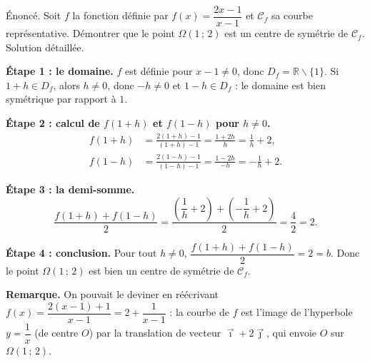 \documentclass[11pt]{article}
\def\setminus{\mathbin{\backslash}}\let\smallsetminus\setminus
\begin{document}
\begin{exoresolu}[Montrer que $\Omega(1\,;\,2)$ est centre de symétrie de la courbe de $f(x) = \dfrac{2x-1}{x-1}$]
Énoncé. Soit $f$ la fonction définie par $f(x) = \dfrac{2x - 1}{x - 1}$ et $\mathcal{C}_f$ sa courbe représentative. Démontrer que le point $\Omega(1\,;\,2)$ est un centre de symétrie de $\mathcal{C}_f$.
\tcblower
Solution détaillée.

\textbf{Étape 1 : le domaine.} $f$ est définie pour $x - 1 \neq 0$, donc $D_f = \mathbb{R} \setminus \{1\}$. Si $1 + h \in D_f$, alors $h \neq 0$, donc $-h \neq 0$ et $1 - h \in D_f$ : le domaine est bien symétrique par rapport à $1$.

\textbf{Étape 2 : calcul de $f(1 + h)$ et $f(1 - h)$ pour $h \neq 0$.}
\begin{align*}
f(1 + h) &= \frac{2(1 + h) - 1}{(1 + h) - 1} = \frac{1 + 2h}{h} = \frac{1}{h} + 2,\\[4pt]
f(1 - h) &= \frac{2(1 - h) - 1}{(1 - h) - 1} = \frac{1 - 2h}{-h} = -\frac{1}{h} + 2.
\end{align*}

\textbf{Étape 3 : la demi-somme.}
\[
\frac{f(1 + h) + f(1 - h)}{2} = \frac{\left(\dfrac{1}{h} + 2\right) + \left(-\dfrac{1}{h} + 2\right)}{2} = \frac{4}{2} = 2.
\]

\textbf{Étape 4 : conclusion.} Pour tout $h \neq 0$, $\dfrac{f(1+h) + f(1-h)}{2} = 2 = b$. Donc le point $\Omega(1\,;\,2)$ est bien un centre de symétrie de $\mathcal{C}_f$.

\textbf{Remarque.} On pouvait le deviner en réécrivant $f(x) = \dfrac{2(x-1) + 1}{x - 1} = 2 + \dfrac{1}{x - 1}$ : la courbe de $f$ est l'image de l'hyperbole $y = \dfrac{1}{x}$ (de centre $O$) par la translation de vecteur $\vec{\imath} + 2\vec{\jmath}$, qui envoie $O$ sur $\Omega(1\,;\,2)$.
\end{exoresolu}
\end{document}
